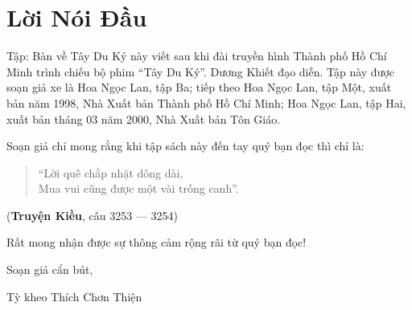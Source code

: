 \chapter*{Lời Nói Đầu} %
\label{cha:loi_noi_dau}

Tập: Bàn về Tây Du Ký này viết sau khi đài truyền hình Thành phố Hồ Chí Minh trình chiếu bộ phim ``Tây Du Ký''. Dương Khiết đạo diễn. Tập này được soạn giả xe là Hoa Ngọc Lan, tập Ba; tiếp theo Hoa Ngọc Lan, tập Một, xuất bản năm 1998, Nhà Xuất bản Thành phố Hồ Chí Minh; Hoa Ngọc Lan, tập Hai, xuất bản tháng 03 năm 2000, Nhà Xuất bản Tôn Giáo.

Soạn giả chỉ mong rằng khi tập sách này đến tay quý bạn đọc thì chỉ là:

\begin{verse}
\begin{itshape}
``Lời quê chắp nhặt dông dài,\\
Mua vui cũng được một vài trống canh''.
\end{itshape}
\end{verse}

\hfill
({\bf Truyện Kiều}, câu 3253 — 3254)

Rất mong nhận được sự thông cảm rộng rãi từ quý bạn đọc!

\vfill
\hfill
\begin{minipage}{0.6\textwidth}
\begin{center}
Soạn giả cẩn bút,

Tỳ kheo Thích Chơn Thiện
\end{center}
\end{minipage}
\vfill
